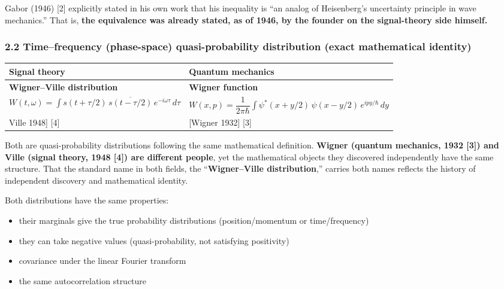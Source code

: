 \documentclass[
]{article}
\newcounter{none} %
\providecommand{\tightlist}{%
  \setlength{\itemsep}{0pt}\setlength{\parskip}{0pt}}
\begin{document}
Gabor (1946) {[}2{]} explicitly stated in his own work that his
inequality is ``an analog of Heisenberg's uncertainty principle in wave
mechanics.'' That is, \textbf{the equivalence was already stated, as of
1946, by the founder on the signal-theory side himself.}

\subsubsection{2.2 Time--frequency (phase-space) quasi-probability
distribution (exact mathematical
identity)}\label{timefrequency-phase-space-quasi-probability-distribution-exact-mathematical-identity}

{\def\LTcaptype{none} %
\begin{longtable}[]{@{}
  >{\raggedright\arraybackslash}p{}
  >{\raggedright\arraybackslash}p{}@{}}
\toprule\noalign{}
\begin{minipage}[b]{\linewidth}\raggedright
Signal theory
\end{minipage} & \begin{minipage}[b]{\linewidth}\raggedright
Quantum mechanics
\end{minipage} \\
\midrule\noalign{}
\endhead
\bottomrule\noalign{}
\endlastfoot
\textbf{Wigner--Ville distribution} & \textbf{Wigner function} \\
\(W(t,\omega) = \int s(t+\tau/2)\,\overline{s(t-\tau/2)}\, e^{-i\omega\tau}\, d\tau\)
&
\(W(x,p) = \dfrac{1}{2\pi\hbar}\int \psi^*(x+y/2)\,\psi(x-y/2)\, e^{ipy/\hbar}\, dy\) \\
{[}Ville 1948{]} {[}4{]} & {[}Wigner 1932{]} {[}3{]} \\
\end{longtable}
}

Both are quasi-probability distributions following the same mathematical
definition. \textbf{Wigner (quantum mechanics, 1932 {[}3{]}) and Ville
(signal theory, 1948 {[}4{]}) are different people}, yet the
mathematical objects they discovered independently have the same
structure. That the standard name in both fields, the
``\textbf{Wigner--Ville distribution},'' carries both names reflects the
history of independent discovery and mathematical identity.

Both distributions have the same properties:

\begin{itemize}
\tightlist
\item
  their marginals give the true probability distributions
  (position/momentum or time/frequency)
\item
  they can take negative values (quasi-probability, not satisfying
  positivity)
\item
  covariance under the linear Fourier transform
\item
  the same autocorrelation structure
\end{itemize}
\end{document}
